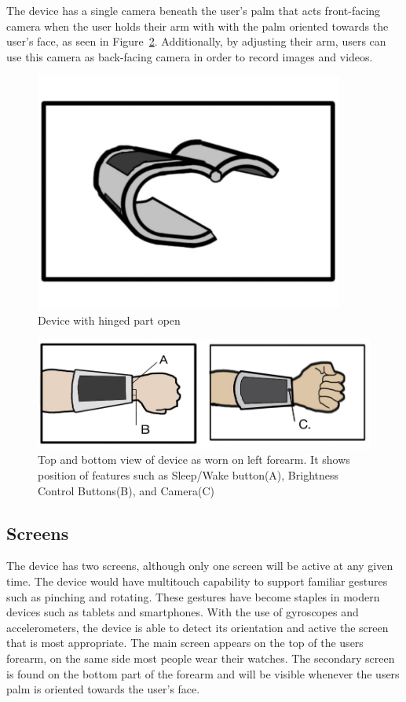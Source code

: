 \documentclass[11pt]{article}
\begin{document}
The device has a single camera beneath the user's palm that acts front-facing camera when the user holds their arm with with the palm oriented towards the user's face, as seen in Figure~\ref{fig:deviceOnArm}. Additionally, by adjusting their arm, users can use this camera as back-facing camera in order to record images and videos. 
\begin{figure}[H] %
   \centering
   \includegraphics[width=4in]{device.pdf}       
   \caption{Device with hinged part open}
   \label{fig:device}
\end{figure}
\begin{figure}[H] %
   \centering
   \includegraphics[width=5in]{devicearm.png}   
   \caption{Top and bottom view of device as worn on left forearm. It shows position of features such as Sleep/Wake button(A), Brightness Control Buttons(B), and Camera(C)}
   \label{fig:deviceOnArm}
\end{figure}

\subsection{Screens}

The device has two screens, although only one screen will be active at any given time. The device would have multitouch capability to support familiar gestures such as pinching and rotating. These gestures have become staples in modern devices such as tablets and smartphones. With the use of gyroscopes and accelerometers, the device is able to detect its orientation and active the screen that is most appropriate.  The main screen appears on the top of the users forearm, on the same side most people wear their watches. The secondary screen is found on the bottom part of the forearm and will be visible whenever the users palm is oriented towards the user's face.
\end{document}
